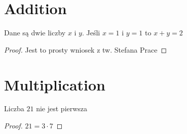 %

\section {Addition}

\begin{theorem}
\label{thm:one_plus_one}
Dane są dwie liczby $x$ i $y$. Jeśli $x = 1$ i $y = 1$ to $x + y = 2$
\end{theorem}
\begin{proof}
  Jest to prosty wniosek z tw. Stefana Prace
\end{proof}

\section {Multiplication}
\begin{theorem}
\label{thm:21_not_prime}
Liczba $21$ nie jest pierwsza
\end{theorem}
\begin{proof}
  $21 = 3 \cdot 7$
\end{proof}
